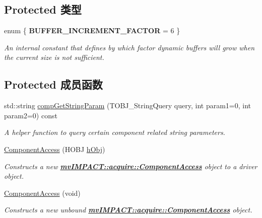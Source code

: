 \subsection*{Protected 类型}
\begin{DoxyCompactItemize}
\item 
\hypertarget{classmv_i_m_p_a_c_t_1_1acquire_1_1_component_access_a3f76207dd889dca9dc7ba480dc2a6792}{enum \{ {\bfseries B\+U\+F\+F\+E\+R\+\_\+\+I\+N\+C\+R\+E\+M\+E\+N\+T\+\_\+\+F\+A\+C\+T\+O\+R} = 6
 \}}\label{classmv_i_m_p_a_c_t_1_1acquire_1_1_component_access_a3f76207dd889dca9dc7ba480dc2a6792}

\begin{DoxyCompactList}\small\item\em An internal constant that defines by which factor dynamic buffers will grow when the current size is not sufficient. \end{DoxyCompactList}\end{DoxyCompactItemize}
\subsection*{Protected 成员函数}
\begin{DoxyCompactItemize}
\item 
std\+::string \hyperlink{classmv_i_m_p_a_c_t_1_1acquire_1_1_component_access_a00b32b493df38e7b351c48ba1060933b}{comp\+Get\+String\+Param} (T\+O\+B\+J\+\_\+\+String\+Query query, int param1=0, int param2=0) const 
\begin{DoxyCompactList}\small\item\em A helper function to query certain component related string parameters. \end{DoxyCompactList}\item 
\hyperlink{classmv_i_m_p_a_c_t_1_1acquire_1_1_component_access_a44789e160eadc7b71e2c8f573cc2b08b}{Component\+Access} (H\+O\+B\+J \hyperlink{classmv_i_m_p_a_c_t_1_1acquire_1_1_component_access_a071d08bf770f55552998b86580e979de}{h\+Obj})
\begin{DoxyCompactList}\small\item\em Constructs a new {\bfseries \hyperlink{classmv_i_m_p_a_c_t_1_1acquire_1_1_component_access}{mv\+I\+M\+P\+A\+C\+T\+::acquire\+::\+Component\+Access}} object to a driver object. \end{DoxyCompactList}\item 
\hypertarget{classmv_i_m_p_a_c_t_1_1acquire_1_1_component_access_ad7407b550cbfcb1ce3373f1cdce9471b}{\hyperlink{classmv_i_m_p_a_c_t_1_1acquire_1_1_component_access_ad7407b550cbfcb1ce3373f1cdce9471b}{Component\+Access} (void)}\label{classmv_i_m_p_a_c_t_1_1acquire_1_1_component_access_ad7407b550cbfcb1ce3373f1cdce9471b}

\begin{DoxyCompactList}\small\item\em Constructs a new unbound {\bfseries \hyperlink{classmv_i_m_p_a_c_t_1_1acquire_1_1_component_access}{mv\+I\+M\+P\+A\+C\+T\+::acquire\+::\+Component\+Access}} object. \end{DoxyCompactList}\end{DoxyCompactItemize}
